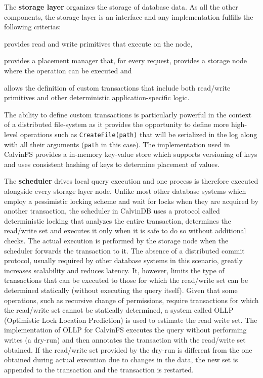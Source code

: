 The \textbf{storage layer} organizes the storage of database data.
As all the other components, the storage layer is an interface and any implementation fulfills the following criterias: 
\begin{inparaenum}[i)]
    \item provides read and write primitives that execute on the node,
    \item provides a placement manager that, for every request, provides a storage node where the operation can be executed and
    \item allows the definition of custom transactions that include both read/write primitives and other deterministic application-specific logic.
\end{inparaenum}
The ability to define custom transactions is particularly powerful in the context of a distributed file-system as it provides the opportunity to define more high-level operations such as \texttt{CreateFile(path)} that will be serialized in the log along with all their arguments (\texttt{path} in this case).
The implementation used in CalvinFS provides a in-memory key-value store which supports versioning of keys and uses consistent hashing of keys to determine placement of values.

The \textbf{scheduler} drives local query execution and one process is therefore executed alongside every storage layer node.
Unlike most other database systems which employ a pessimistic locking scheme and wait for locks when they are acquired by another transaction, the scheduler in CalvinDB uses a protocol called deterministic locking that analyzes the entire transaction, determines the read/write set and executes it only when it is safe to do so without additional checks.
The actual execution is performed by the storage node when the scheduler forwards the transaction to it.
The absence of a distributed commit protocol, usually required by other database systems in this scenario, greatly increases scalability and reduces latency.
It, however, limits the type of transactions that can be executed to those for which the read/write set can be determined statically (without executing the query itself).
Given that some operations, such as recursive change of permissions, require transactions for which the read/write set cannot be statically determined, a system called OLLP (Optimistic Lock Location Prediction) is used to estimate the read write set.
The implementation of OLLP for CalvinFS executes the query without performing writes (a dry-run) and then annotates the transaction with the read/write set obtained.
If the read/write set provided by the dry-run is different from the one obtained during actual execution due to changes in the data, the new set is appended to the transaction and the transaction is restarted.

